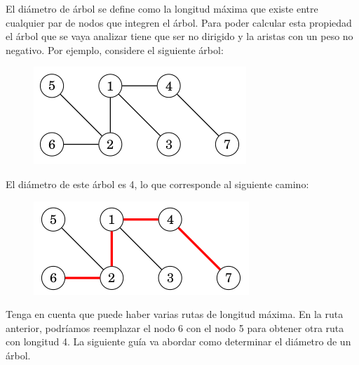 El diámetro de árbol se define como la longitud máxima que existe entre cualquier par de nodos que integren el árbol. Para poder calcular esta propiedad el árbol que se vaya analizar tiene que ser no dirigido y la aristas con un peso no negativo. Por ejemplo, considere el siguiente árbol:

\begin{figure}[h!]
	\centering
	\includegraphics[width=0.5\linewidth]{img/diameter_tree_1}
	\label{fig:diametertree1}
\end{figure}

El diámetro de este árbol es 4, lo que corresponde al siguiente camino:

\begin{figure}[h!]
	\centering
	\includegraphics[width=0.5\linewidth]{img/diameter_tree_2}
	\label{fig:diametertree2}
\end{figure}

Tenga en cuenta que puede haber varias rutas de longitud máxima. En la ruta anterior, podríamos reemplazar el nodo 6 con el nodo 5 para obtener otra ruta con longitud 4. La siguiente guía va abordar como determinar el diámetro de un árbol.